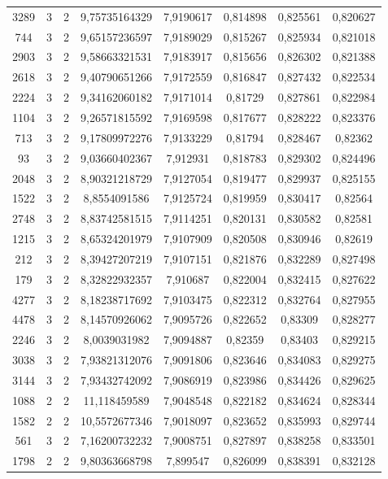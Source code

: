 \begin{longtable}{|c|c|c|c|c|c|c|c|}
3289 & 3 & 2 & 9,75735164329 & 7,9190617 & 0,814898 & 0,825561 & 0,820627 \\
744 & 3 & 2 & 9,65157236597 & 7,9189029 & 0,815267 & 0,825934 & 0,821018 \\
2903 & 3 & 2 & 9,58663321531 & 7,9183917 & 0,815656 & 0,826302 & 0,821388 \\
2618 & 3 & 2 & 9,40790651266 & 7,9172559 & 0,816847 & 0,827432 & 0,822534 \\
2224 & 3 & 2 & 9,34162060182 & 7,9171014 & 0,81729 & 0,827861 & 0,822984 \\
1104 & 3 & 2 & 9,26571815592 & 7,9169598 & 0,817677 & 0,828222 & 0,823376 \\
713 & 3 & 2 & 9,17809972276 & 7,9133229 & 0,81794 & 0,828467 & 0,82362 \\
93 & 3 & 2 & 9,03660402367 & 7,912931 & 0,818783 & 0,829302 & 0,824496 \\
2048 & 3 & 2 & 8,90321218729 & 7,9127054 & 0,819477 & 0,829937 & 0,825155 \\
1522 & 3 & 2 & 8,8554091586 & 7,9125724 & 0,819959 & 0,830417 & 0,82564 \\
2748 & 3 & 2 & 8,83742581515 & 7,9114251 & 0,820131 & 0,830582 & 0,82581 \\
1215 & 3 & 2 & 8,65324201979 & 7,9107909 & 0,820508 & 0,830946 & 0,82619 \\
212 & 3 & 2 & 8,39427207219 & 7,9107151 & 0,821876 & 0,832289 & 0,827498 \\
179 & 3 & 2 & 8,32822932357 & 7,910687 & 0,822004 & 0,832415 & 0,827622 \\
4277 & 3 & 2 & 8,18238717692 & 7,9103475 & 0,822312 & 0,832764 & 0,827955 \\
4478 & 3 & 2 & 8,14570926062 & 7,9095726 & 0,822652 & 0,83309 & 0,828277 \\
2246 & 3 & 2 & 8,0039031982 & 7,9094887 & 0,82359 & 0,83403 & 0,829215 \\
3038 & 3 & 2 & 7,93821312076 & 7,9091806 & 0,823646 & 0,834083 & 0,829275 \\
3144 & 3 & 2 & 7,93432742092 & 7,9086919 & 0,823986 & 0,834426 & 0,829625 \\
1088 & 2 & 2 & 11,118459589 & 7,9048548 & 0,822182 & 0,834624 & 0,828344 \\
1582 & 2 & 2 & 10,5572677346 & 7,9018097 & 0,823652 & 0,835993 & 0,829744 \\
561 & 3 & 2 & 7,16200732232 & 7,9008751 & 0,827897 & 0,838258 & 0,833501 \\
1798 & 2 & 2 & 9,80363668798 & 7,899547 & 0,826099 & 0,838391 & 0,832128 \\

\end{longtable}
